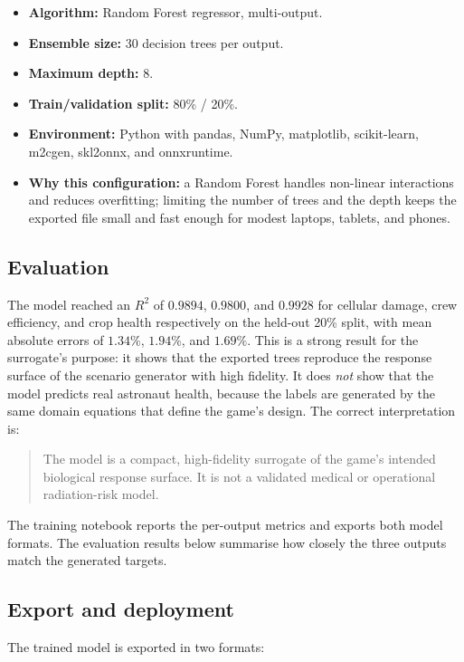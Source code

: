 \documentclass[11pt,a4paper]{article}
\begin{document}
\begin{itemize}
  \item \textbf{Algorithm:} Random Forest regressor, multi-output.
  \item \textbf{Ensemble size:} 30 decision trees per output.
  \item \textbf{Maximum depth:} 8.
  \item \textbf{Train/validation split:} 80\% / 20\%.
  \item \textbf{Environment:} Python with pandas, NumPy, matplotlib, scikit-learn, m2cgen, skl2onnx, and onnxruntime.
  \item \textbf{Why this configuration:} a Random Forest handles non-linear interactions and reduces overfitting; limiting the number of trees and the depth keeps the exported file small and fast enough for modest laptops, tablets, and phones.
\end{itemize}

\subsection{Evaluation}

The model reached an $R^2$ of $0.9894$, $0.9800$, and $0.9928$ for cellular damage, crew efficiency, and crop health respectively on the held-out 20\% split, with mean absolute errors of $1.34\%$, $1.94\%$, and $1.69\%$. This is a strong result for the surrogate's purpose: it shows that the exported trees reproduce the response surface of the scenario generator with high fidelity. It does \emph{not} show that the model predicts real astronaut health, because the labels are generated by the same domain equations that define the game's design. The correct interpretation is:

\begin{quote}
The model is a compact, high-fidelity surrogate of the game's intended biological response surface. It is not a validated medical or operational radiation-risk model.
\end{quote}

The training notebook reports the per-output metrics and exports both model formats. The evaluation results below summarise how closely the three outputs match the generated targets.

\subsection{Export and deployment}

The trained model is exported in two formats:
\end{document}
